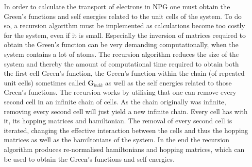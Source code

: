 In order to calculate the transport of electrons in NPG one must obtain the Green's functions and self energies related to the unit cells of the system. To do so, a recursion algorithm must be implemented as calculations become too costly for the system, even if it is small. Especially the inversion of matrices required to obtain the Green's function can be very demanding computationally, when the system contains a lot of atoms. The recursion algorithm reduces the size of the system and thereby the amount of computational time required to obtain both the first cell Green's function, the Green's function within the chain (of repeated unit cells) sometimes called \(\mathbf{G}_{bulk}\) as well as the self energies related to those Green's functions. The recursion works by utilising that one can remove every second cell in an infinite chain of cells. As the chain originally was infinite, removing every second cell will just yield a new infinite chain. Every cell has with it, its hopping matrices and hamiltonian. The removal of every second cell is iterated, changing the effective interaction between the cells and thus the hopping matrices as well as the hamiltonians of the system. In the end the recursion algorithm produces re-normalised hamiltonians and hopping matrices, which can be used to obtain the Green's functions and self energies. 
